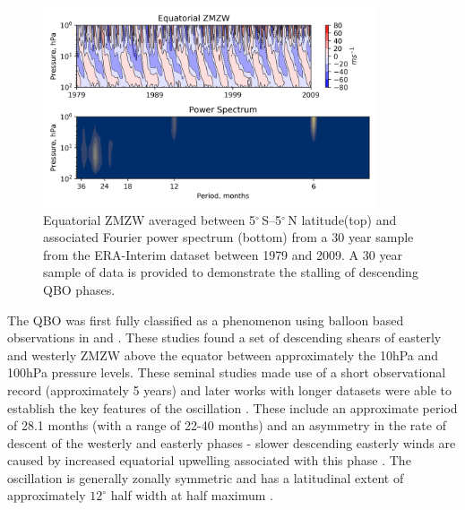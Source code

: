 \begin{figure}[h!]
\centering
    \includegraphics[width=0.88\textwidth]{Figures/Figures-background/QBO_SAO_ERA.png}
    \caption[Equatorial ZMZW and associated Fourier power spectrum from ERA-Interim.]{Equatorial ZMZW averaged between 5$^{\circ}$\,S--5$^{\circ}$\,N latitude(top) and associated Fourier power spectrum (bottom) from a 30 year sample from the ERA-Interim dataset between 1979 and 2009. A 30 year sample of data is provided to demonstrate the stalling of descending QBO phases.}
    \label{fig:QBO_SAO_ERA}
\centering
\end{figure}

The QBO was first fully classified as a phenomenon using balloon based observations in \cite{ebdonNotes1960, ebdonFluctuations1961} and \cite{reedQuasiBiennial1965}. These studies found a set of descending shears of easterly and westerly ZMZW above the equator between approximately the 10hPa and 100hPa pressure levels. These seminal studies made use of a short observational record (approximately 5 years) and later works with longer datasets were able to establish the key features of the oscillation \citep{baldwinQuasiBiennial2001,pascoeQuasibiennial2005b, schenzingerDefining2017}. These include an approximate period of 28.1 months (with a range of 22-40 months) and an asymmetry in the rate of descent of the westerly and easterly phases - slower descending easterly winds are caused by increased equatorial upwelling associated with this phase \citep{pascoeQuasibiennial2005b}. The oscillation is generally zonally symmetric \citep{belmontVARIATION1968} and has a latitudinal extent of approximately $12^{\circ}$ half width at half maximum \citep{baldwinQuasiBiennial2001}.

